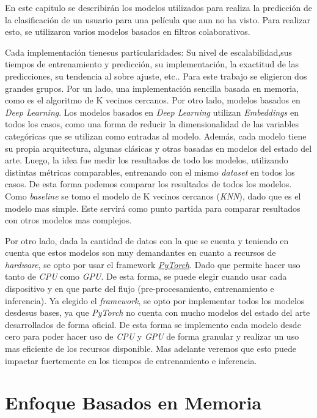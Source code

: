 \documentclass[11pt,a4paper,twoside]{thesis}
\begin{document}
En este capitulo se describirán los modelos utilizados para realiza la
predicción de la clasificación de un usuario para una película que aun no ha
visto. Para realizar esto, se utilizaron varios modelos basados en filtros
colaborativos.

Cada implementación tienesus particularidades: Su nivel de escalabilidad,sus
tiempos de entrenamiento y predicción, su implementación, la exactitud de las
predicciones, su tendencia al sobre ajuste, etc.. Para este trabajo se
eligieron dos grandes grupos. Por un lado, una implementación sencilla basada
en memoria, como es el algoritmo de K vecinos cercanos. Por otro lado, modelos
basados en \textit{Deep Learning}. Los modelos basados en \textit{Deep
	Learning} utilizan \textit{Embeddings} en todos los casos, como una forma de
reducir la dimensionalidad de las variables categóricas que se utilizan como
entradas al modelo. Además, cada modelo tiene su propia arquitectura, algunas
clásicas y otras basadas en modelos del estado del arte. Luego, la idea fue
medir los resultados de todo los modelos, utilizando distintas métricas
comparables, entrenando con el mismo \textit{dataset} en todos los casos. De
esta forma podemos comparar los resultados de todos los modelos. Como
\textit{baseline} se tomo el modelo de K vecinos cercanos (\textit{KNN}), dado
que es el modelo mas simple. Este servirá como punto partida para comparar
resultados con otros modelos mas complejos.

Por otro lado, dada la cantidad de datos con la que se cuenta y teniendo en
cuenta que estos modelos son muy demandantes en cuanto a recursos de
\textit{hardware}, se opto por usar el framework
\href{https://pytorch.org/}{\textit{PyTorch}}. Dado que permite hacer uso tanto
de \textit{CPU} como \textit{GPU}. De esta forma, se puede elegir cuando usar
cada dispositivo y en que parte del flujo (pre-procesamiento, entrenamiento e
inferencia). Ya elegido el \textit{framework}, se opto por implementar todos
los modelos desdesus bases, ya que \textit{PyTorch} no cuenta con mucho modelos
del estado del arte desarrollados de forma oficial. De esta forma se implemento
cada modelo desde cero para poder hacer uso de \textit{CPU} y \textit{GPU} de
forma granular y realizar un uso mas eficiente de los recursos disponible. Mas
adelante veremos que esto puede impactar fuertemente en los tiempos de
entrenamiento e inferencia.

\section{Enfoque Basados en Memoria}
\end{document}
